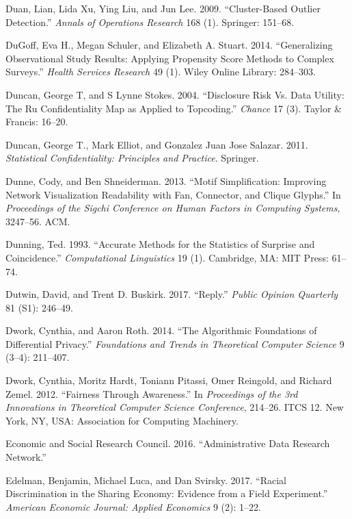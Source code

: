 \documentclass[]{krantz}
\begin{document}
\hypertarget{ref-duan2009cluster}{}
Duan, Lian, Lida Xu, Ying Liu, and Jun Lee. 2009. ``Cluster-Based
Outlier Detection.'' \emph{Annals of Operations Research} 168 (1).
Springer: 151--68.

\hypertarget{ref-dugoff2014generalizing}{}
DuGoff, Eva H., Megan Schuler, and Elizabeth A. Stuart. 2014.
``Generalizing Observational Study Results: Applying Propensity Score
Methods to Complex Surveys.'' \emph{Health Services Research} 49 (1).
Wiley Online Library: 284--303.

\hypertarget{ref-duncan2004disclosure}{}
Duncan, George T, and S Lynne Stokes. 2004. ``Disclosure Risk Vs. Data
Utility: The Ru Confidentiality Map as Applied to Topcoding.''
\emph{Chance} 17 (3). Taylor \& Francis: 16--20.

\hypertarget{ref-duncanstatistical}{}
Duncan, George T., Mark Elliot, and Gonzalez Juan Jose Salazar. 2011.
\emph{Statistical Confidentiality: Principles and Practice}. Springer.

\hypertarget{ref-dunne2013motif}{}
Dunne, Cody, and Ben Shneiderman. 2013. ``Motif Simplification:
Improving Network Visualization Readability with Fan, Connector, and
Clique Glyphs.'' In \emph{Proceedings of the Sigchi Conference on Human
Factors in Computing Systems}, 3247--56. ACM.

\hypertarget{ref-Dunning-93}{}
Dunning, Ted. 1993. ``Accurate Methods for the Statistics of Surprise
and Coincidence.'' \emph{Computational Linguistics} 19 (1). Cambridge,
MA: MIT Press: 61--74.

\hypertarget{ref-dutwinbuskirk2017}{}
Dutwin, David, and Trent D. Buskirk. 2017. ``Reply.'' \emph{Public
Opinion Quarterly} 81 (S1): 246--49.

\hypertarget{ref-Dworkroth2014}{}
Dwork, Cynthia, and Aaron Roth. 2014. ``The Algorithmic Foundations of
Differential Privacy.'' \emph{Foundations and Trends in Theoretical
Computer Science} 9 (3--4): 211--407.

\hypertarget{ref-dwork2012}{}
Dwork, Cynthia, Moritz Hardt, Toniann Pitassi, Omer Reingold, and
Richard Zemel. 2012. ``Fairness Through Awareness.'' In
\emph{Proceedings of the 3rd Innovations in Theoretical Computer Science
Conference}, 214--26. ITCS 12. New York, NY, USA: Association for
Computing Machinery.

\hypertarget{ref-EconomicandSocialResearchCouncil2016}{}
Economic and Social Research Council. 2016. ``Administrative Data
Research Network.''

\hypertarget{ref-edelman2017racial}{}
Edelman, Benjamin, Michael Luca, and Dan Svirsky. 2017. ``Racial
Discrimination in the Sharing Economy: Evidence from a Field
Experiment.'' \emph{American Economic Journal: Applied Economics} 9 (2):
1--22.
\end{document}
